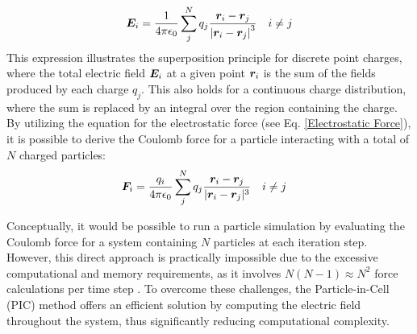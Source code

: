 \begin{equation}
\bm{E}_i = \frac{1}{4 \pi \epsilon_0} \sum_j^N q_j \frac{\bm{r}_i - \bm{r}_j}{\left| \boldsymbol{r}_i - \boldsymbol{r}_j \right|^3} \quad i \neq j
\end{equation}
This expression illustrates the superposition principle for discrete point charges, where the total electric field $\bm{E}_i$ at a given point $\bm{r}_i$ is the sum of the fields produced by each charge $q_j$. This also holds for a continuous charge distribution, where the sum is replaced by an integral over the region containing the charge. By utilizing the equation for the electrostatic force (see Eq. \ref{Electrostatic Force}), it is possible to derive the Coulomb force for a particle interacting with a total of $N$ charged particles:
\begin{align}
\bm{F}_{i} &= \frac{q_i }{4 \pi \epsilon_0} \sum_j^N q_j \frac{\bm{r}_i - \bm{r}_j}{|\bm{r}_i - \bm{r}_j|^3} \quad i \neq j
\end{align}

Conceptually, it would be possible to run a particle simulation by evaluating the Coulomb force for a system containing $N$ particles at each iteration step.  However, this direct approach is practically impossible due to the excessive computational and memory requirements, as it involves $N(N-1) \approx N^2$ force calculations per time step \cite{brieda_plasma_2019}. To overcome these challenges, the Particle-in-Cell (\acs{PIC}) method offers an efficient solution by computing the electric field throughout the system, thus significantly reducing computational complexity.

\begin{comment}    
One such approach is the use of macroparticles, which represent a stack of $w_m$ real ions or electrons moving in unison (discussed comprehensively in Section \textbf{!} \ref{sec: ES PIC}). The used simulation process is illustrated below:
\end{comment}







